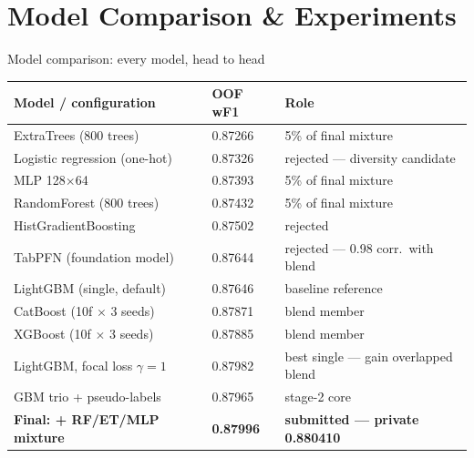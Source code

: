 \documentclass[aspectratio=169,10pt]{beamer}
\begin{document}
\section{Model Comparison \& Experiments}

\begin{frame}{Model comparison: every model, head to head}
  \scriptsize
  \begin{tabular}{@{}lll@{}}
    \toprule
    \textbf{Model / configuration} & \textbf{OOF wF1} & \textbf{Role}\\
    \midrule
    ExtraTrees (800 trees)            & 0.87266 & 5\% of final mixture\\
    Logistic regression (one-hot)     & 0.87326 & rejected --- diversity candidate\\
    MLP 128$\times$64                 & 0.87393 & 5\% of final mixture\\
    RandomForest (800 trees)          & 0.87432 & 5\% of final mixture\\
    HistGradientBoosting              & 0.87502 & rejected\\
    TabPFN (foundation model)         & 0.87644 & rejected --- 0.98 corr.\ with blend\\
    LightGBM (single, default)        & 0.87646 & baseline reference\\
    CatBoost (10f $\times$ 3 seeds)   & 0.87871 & blend member\\
    XGBoost (10f $\times$ 3 seeds)    & 0.87885 & blend member\\
    LightGBM, focal loss $\gamma{=}1$ & 0.87982 & best single --- gain overlapped blend\\
    GBM trio + pseudo-labels          & 0.87965 & stage-2 core\\
    \textbf{Final: + RF/ET/MLP mixture} & \textbf{0.87996} & \textbf{submitted --- private 0.880410}\\
    \bottomrule
  \end{tabular}
\end{frame}
\end{document}
